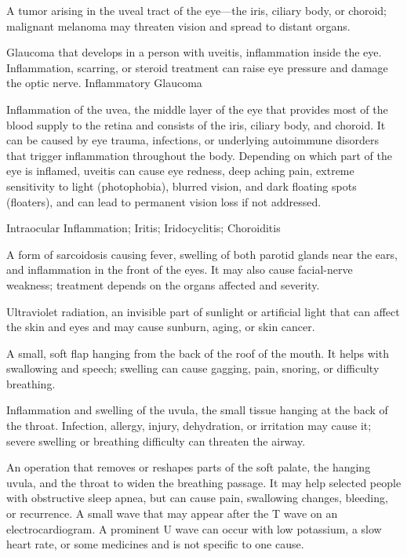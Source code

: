  A tumor arising in the uveal tract of the eye—the iris, ciliary body, or choroid; malignant melanoma may threaten vision and spread to distant organs.

 Glaucoma that develops in a person with uveitis, inflammation inside the eye. Inflammation, scarring, or steroid treatment can raise eye pressure and damage the optic nerve.
\synonyms
Inflammatory Glaucoma

 Inflammation of the uvea, the middle layer of the eye that provides most of the blood supply to the retina and consists of the iris, ciliary body, and choroid. It can be caused by eye trauma, infections, or underlying autoimmune disorders that trigger inflammation throughout the body. Depending on which part of the eye is inflamed, uveitis can cause eye redness, deep aching pain, extreme sensitivity to light (photophobia), blurred vision, and dark floating spots (floaters), and can lead to permanent vision loss if not addressed.

\synonyms
Intraocular Inflammation; Iritis; Iridocyclitis; Choroiditis

 A form of sarcoidosis causing fever, swelling of both parotid glands near the ears, and inflammation in the front of the eyes. It may also cause facial-nerve weakness; treatment depends on the organs affected and severity.

 Ultraviolet radiation, an invisible part of sunlight or artificial light that can affect the skin and eyes and may cause sunburn, aging,
or skin cancer.

 A small, soft flap hanging from the back of the roof of the mouth. It helps with swallowing and speech; swelling can cause gagging, pain, snoring, or difficulty breathing.

 Inflammation and swelling of the uvula, the small tissue hanging at the back of the throat. Infection, allergy, injury, dehydration, or irritation may cause it; severe swelling or breathing difficulty can threaten the airway.

 An operation that removes or reshapes parts of the soft palate, the hanging uvula, and the throat to widen the breathing passage. It may help selected people with obstructive sleep apnea, but can cause pain, swallowing changes, bleeding, or recurrence.
 A small wave that may appear after the T wave on an electrocardiogram. A prominent U wave can occur with low potassium, a slow heart rate, or some medicines and is not specific to one cause.
